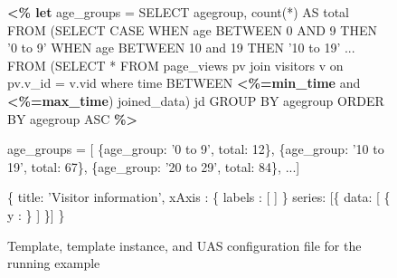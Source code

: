 \begin{figure*}
\centering
%
%
\begin{minipage}[c]{7.5cm}
%
\begin{minipage}[c]{7.5cm}
\begin{code}
\textbf{<\% let} age_groups = 
   SELECT agegroup, count(*) AS total 
   FROM (SELECT CASE
    WHEN age BETWEEN 0 AND 9 THEN '0 to 9'
    WHEN age BETWEEN 10 and 19 THEN '10 to 19'
     ...
    FROM (SELECT * FROM page_views pv join visitors v 
          on pv.v_id = v.vid where time BETWEEN 
          \textbf{<\%=min_time} and \textbf{<\%=max_time}) joined_data) jd
   GROUP BY agegroup  
   ORDER BY agegroup ASC \textbf{\%>}
\end{code}
\vspace*{-0.3cm}
\label{figure:running-example:data-retrieval}
\vspace*{0.3cm}
\end{minipage}

\begin{minipage}[c]{7.5cm}
\begin{code}
age_groups = [
   \{age_group: '0 to 9', total: 12\}, 
   \{age_group: '10 to 19', total: 67\},
   \{age_group: '20 to 29', total: 84\},  ...]
\end{code}
\vspace*{-0.3cm}
\label{figure:running-example:query-result}
\vspace*{0.3cm}
\end{minipage}
%
\end{minipage}
\hspace{1cm}
\begin{minipage}[c]{6cm}

\begin{minipage}[c]{8.5cm}
\begin{code}
  \{
    title: 'Visitor information',
    xAxis : \{ 
      labels : [
        ]
    \}
    series: [\{
      data: [ 
          \{
            y  : 
          \}
         ]
    \}]
  \}
\end{code}
\vspace*{-0.3cm}
\vspace*{0.3cm}
\label{figure:running-example:main-template}
\end{minipage}
\end{minipage}

\caption{Template, template instance, and UAS configuration file for the running example}

\end{figure*}


